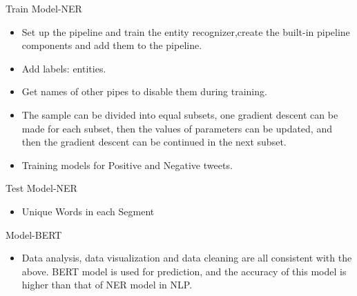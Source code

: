 \documentclass[
 size=14pt,
 paper=smartboard,  %
 mode=present, 		%
 display=slides, 	%
 style=tuliplab,  	%
 pauseslide,
 fleqn,leqno]{powerdot}
\begin{document}
\begin{slide}[toc=,bm=]{Train Model-NER}
\begin{itemize}
\item
Set up the pipeline and train the entity recognizer,create the built-in pipeline components and add them to the pipeline.
\item
Add labels: entities.
\item
Get names of other pipes to disable them during training.
\item
The sample can be divided into equal subsets, one gradient descent can be made for each subset, then the values of parameters can be updated, and then the gradient descent can be continued in the next subset.
\item
Training models for Positive and Negative tweets.
\end{itemize}
\end{slide}
\begin{slide}[toc=,bm=]{Test Model-NER}
\begin{itemize}
\item
Unique Words in each Segment
\end{itemize}
\vspace{-0.8cm}
\begin{figure}[htbp]
\centering
{}%
%
\centering
\end{figure}
\end{slide}


\begin{slide}[toc=,bm=]{Model-BERT}
\begin{itemize}
\item
Data analysis, data visualization and data cleaning are all consistent with the above. BERT model is used for prediction, and the accuracy of this model is higher than that of NER model in NLP.
\end{itemize}
\end{slide}
\end{document}
